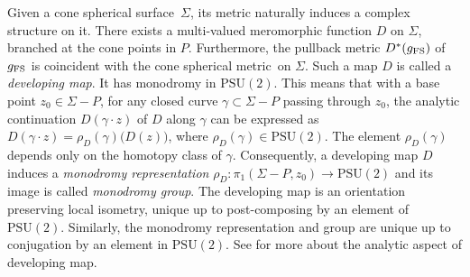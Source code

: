 \documentclass[pdflatex,sn-mathphys]{sn-jnl}%
\numberwithin{equation}{section}
\theoremstyle{thmstyleone}%
\newcommand{\PSUtwo}{\mathrm{PSU}(2)}
\newcommand{\csphsf}{cone spherical surface}
\newcommand{\csphmtr}{cone spherical metric}
\newcommand{\DEF}{\emph}
\begin{document}
Given a \csphsf\ $\Sigma$, its metric naturally induces a complex structure on it. There exists a multi-valued meromorphic function $D$ on $\Sigma$, branched at the cone points in $P$. Furthermore, the pullback metric $D^*(g_{\rm FS})$ of $g_{\rm FS}$ is coincident with the \csphmtr\ on $\Sigma$. Such a map $D$ is called a \DEF{developing map}.
It has monodromy in $\PSUtwo$. This means that with a base point $z_0\in \Sigma- P$, for any closed curve $\gamma\subset\Sigma- P$ passing through $z_0$, the analytic continuation $D(\gamma\cdot z)$ of $D$ along $\gamma$ can be expressed as $D(\gamma\cdot z) = \rho_D(\gamma)\big( D(z) \big)$, where $\rho_D(\gamma)\in\PSUtwo$. The element $\rho_D(\gamma)$ depends only on the homotopy class of $\gamma$. Consequently, a developing map $D$ induces a \DEF{monodromy representation} $\rho_D:\pi_1(\Sigma-P,z_0) \to \PSUtwo$ and its image is called \DEF{monodromy group}.
The developing map is an orientation preserving local isometry, unique up to post-composing by an element of $\PSUtwo$. Similarly, the monodromy representation and group are unique up to conjugation by an element in $\PSUtwo$.
See \cite{UYa00, Erm04, CWWX15, SCLX20} for more about the analytic aspect of developing map.
\end{document}
